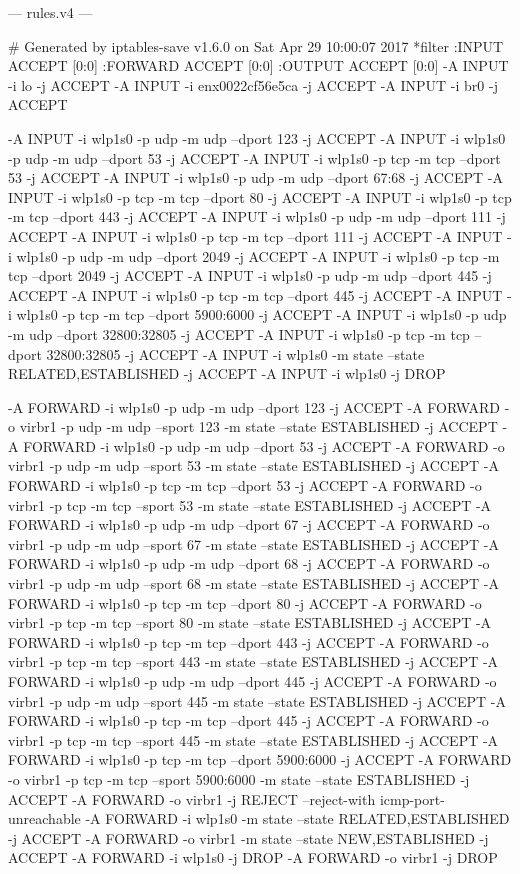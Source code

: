 \documentclass[mingoth,a4paper]{jsarticle}
\begin{document}
--- rules.v4 ---
\begin{commandline}
# Generated by iptables-save v1.6.0 on Sat Apr 29 10:00:07 2017
*filter
:INPUT ACCEPT [0:0]
:FORWARD ACCEPT [0:0]
:OUTPUT ACCEPT [0:0]
-A INPUT -i lo -j ACCEPT
-A INPUT -i enx0022cf56e5ca -j ACCEPT
-A INPUT -i br0 -j ACCEPT

-A INPUT -i wlp1s0 -p udp -m udp --dport 123 -j ACCEPT
-A INPUT -i wlp1s0 -p udp -m udp --dport 53 -j ACCEPT
-A INPUT -i wlp1s0 -p tcp -m tcp --dport 53 -j ACCEPT
-A INPUT -i wlp1s0 -p udp -m udp --dport 67:68 -j ACCEPT
-A INPUT -i wlp1s0 -p tcp -m tcp --dport 80 -j ACCEPT
-A INPUT -i wlp1s0 -p tcp -m tcp --dport 443 -j ACCEPT
-A INPUT -i wlp1s0 -p udp -m udp --dport 111 -j ACCEPT
-A INPUT -i wlp1s0 -p tcp -m tcp --dport 111 -j ACCEPT
-A INPUT -i wlp1s0 -p udp -m udp --dport 2049 -j ACCEPT
-A INPUT -i wlp1s0 -p tcp -m tcp --dport 2049 -j ACCEPT
-A INPUT -i wlp1s0 -p udp -m udp --dport 445 -j ACCEPT
-A INPUT -i wlp1s0 -p tcp -m tcp --dport 445 -j ACCEPT
-A INPUT -i wlp1s0 -p tcp -m tcp --dport 5900:6000 -j ACCEPT
-A INPUT -i wlp1s0 -p udp -m udp --dport 32800:32805 -j ACCEPT
-A INPUT -i wlp1s0 -p tcp -m tcp --dport 32800:32805 -j ACCEPT
-A INPUT -i wlp1s0 -m state --state RELATED,ESTABLISHED -j ACCEPT
-A INPUT -i wlp1s0 -j DROP


-A FORWARD -i wlp1s0 -p udp -m udp --dport 123 -j ACCEPT
-A FORWARD -o virbr1 -p udp -m udp --sport 123 -m state --state ESTABLISHED -j ACCEPT
-A FORWARD -i wlp1s0 -p udp -m udp --dport 53 -j ACCEPT
-A FORWARD -o virbr1 -p udp -m udp --sport 53 -m state --state ESTABLISHED -j ACCEPT
-A FORWARD -i wlp1s0 -p tcp -m tcp --dport 53 -j ACCEPT
-A FORWARD -o virbr1 -p tcp -m tcp --sport 53 -m state --state ESTABLISHED -j ACCEPT
-A FORWARD -i wlp1s0 -p udp -m udp --dport 67 -j ACCEPT
-A FORWARD -o virbr1 -p udp -m udp --sport 67 -m state --state ESTABLISHED -j ACCEPT
-A FORWARD -i wlp1s0 -p udp -m udp --dport 68 -j ACCEPT
-A FORWARD -o virbr1 -p udp -m udp --sport 68 -m state --state ESTABLISHED -j ACCEPT
-A FORWARD -i wlp1s0 -p tcp -m tcp --dport 80 -j ACCEPT
-A FORWARD -o virbr1 -p tcp -m tcp --sport 80 -m state --state ESTABLISHED -j ACCEPT
-A FORWARD -i wlp1s0 -p tcp -m tcp --dport 443 -j ACCEPT
-A FORWARD -o virbr1 -p tcp -m tcp --sport 443 -m state --state ESTABLISHED -j ACCEPT
-A FORWARD -i wlp1s0 -p udp -m udp --dport 445 -j ACCEPT
-A FORWARD -o virbr1 -p udp -m udp --sport 445 -m state --state ESTABLISHED -j ACCEPT
-A FORWARD -i wlp1s0 -p tcp -m tcp --dport 445 -j ACCEPT
-A FORWARD -o virbr1 -p tcp -m tcp --sport 445 -m state --state ESTABLISHED -j ACCEPT
-A FORWARD -i wlp1s0 -p tcp -m tcp --dport 5900:6000 -j ACCEPT
-A FORWARD -o virbr1 -p tcp -m tcp --sport 5900:6000 -m state --state ESTABLISHED -j ACCEPT
-A FORWARD -o virbr1 -j REJECT --reject-with icmp-port-unreachable
-A FORWARD -i wlp1s0 -m state --state RELATED,ESTABLISHED -j ACCEPT
-A FORWARD -o virbr1 -m state --state NEW,ESTABLISHED -j ACCEPT
-A FORWARD -i wlp1s0 -j DROP
-A FORWARD -o virbr1 -j DROP


\end{commandline}
\end{document}
